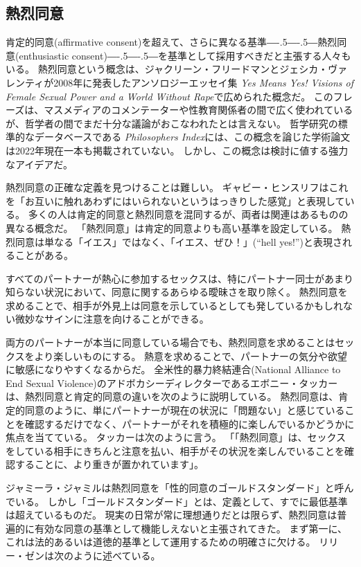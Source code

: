 \documentclass[paper=a4,book,openany]{jlreq}
\newcommand{\ig}[1]{}           %
\def\DDASH{―\kern-.5\zw―\kern-.5\zw―}
\begin{document}
\subsection{熱烈同意}

肯定的同意(affirmative consent)を超えて、さらに異なる基準{\DDASH}熱烈同意(enthusiastic consent){\DDASH}を基準として採用すべきだと主張する人々もいる。
熱烈同意という概念は、ジャクリーン・フリードマン\ig{Jaclyn Friedman}とジェシカ・ヴァレンティ\ig{Jessica Valenti}が2008年に発表したアンソロジーエッセイ集 \emph{Yes Means Yes! Visions of Female Sexual Power and a World Without Rape}で広められた概念だ\citep[pp. 308--309]{friedman08:_yes_means_yes}。
このフレーズは、マスメディアのコメンテーターや性教育関係者の間で広く使われているが、哲学者の間でまだ十分な議論がおこなわれたとは言えない。
哲学研究の標準的なデータベースである \emph{Philosophers Index}には、この概念を論じた学術論文は2022年現在一本も掲載されていない。
しかし、この概念は検討に値する強力なアイデアだ。

熱烈同意の正確な定義を見つけることは難しい。
ギャビー・ヒンスリフ\ig{Gaby Hinsliff}はこれを「お互いに触れあわずにはいられないというはっきりした感覚」と表現している\citep{hinsliff15:_consen_is_not_enoug}。
多くの人は肯定的同意と熱烈同意を混同するが、両者は関連はあるものの異なる概念だ。
「熱烈同意」は肯定的同意よりも高い基準を設定している。
熱烈同意は単なる「イエス」ではなく、「イエス、ぜひ！」(``hell yes!'')と表現されることがある。

すべてのパートナーが熱心に参加するセックスは、特にパートナー同士があまり知らない状況において、同意に関するあらゆる曖昧さを取り除く。
熱烈同意を求めることで、相手が外見上は同意を示しているとしても発しているかもしれない微妙なサインに注意を向けることができる。

両方のパートナーが本当に同意している場合でも、熱烈同意を求めることはセックスをより楽しいものにする。
熱意を求めることで、パートナーの気分や欲望に敏感になりやすくなるからだ。
全米性的暴力終結連合(National Alliance to End Sexual Violence)のアドボカシーディレクターであるエボニー・タッカー\ig{Ebony Tucker}は、熱烈同意と肯定的同意の違いを次のように説明している。
熱烈同意は、肯定的同意のように、単にパートナーが現在の状況に「問題ない」と感じていることを確認するだけでなく、パートナーがそれを積極的に楽しんでいるかどうかに焦点を当てている。
タッカーは次のように言う。
「「熱烈同意」は、セックスをしている相手にきちんと注意を払い、相手がその状況を楽しんでいることを確認することに、より重きが置かれています」\citep{cooney18:_aziz_ansar_alleg_has_peopl}。

ジャミーラ・ジャミル\ig{Jameela Jamil}は熱烈同意を「性的同意のゴールドスタンダード」と呼んでいる\citep{jamil18:_what_we_need_learn_aziz_ansar_clust}。
しかし「ゴールドスタンダード」とは、定義として、すでに最低基準は超えているものだ。
現実の日常が常に理想通りだとは限らず、熱烈同意は普遍的に有効な同意の基準として機能しえないと主張されてきた。
まず第一に、これは法的あるいは道徳的基準として運用するための明確さに欠ける。
リリー・ゼン\ig{Lily Zheng}は次のように述べている。
\end{document}
